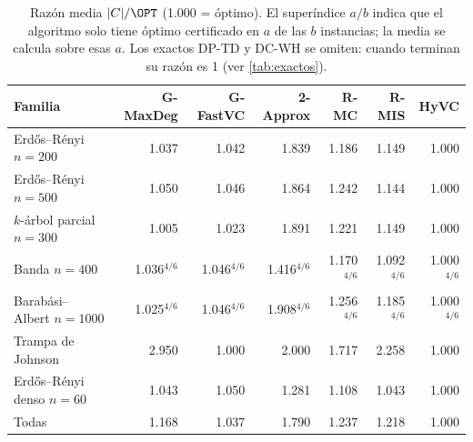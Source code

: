 \begin{table}[!htbp]\centering\scriptsize\setlength{\tabcolsep}{3.5pt}
\begin{tabular}{@{}lrrrrrr@{}}\toprule
Familia & \textsf{G-MaxDeg} & \textsf{G-FastVC} & \textsf{2-Approx} & \textsf{R-MC} & \textsf{R-MIS} & \textsf{HyVC} \\\midrule
Erdős–Rényi $n{=}200$ & 1.037 & 1.042 & 1.839 & 1.186 & 1.149 & 1.000 \\
Erdős–Rényi $n{=}500$ & 1.050 & 1.046 & 1.864 & 1.242 & 1.144 & 1.000 \\
$k$-árbol parcial $n{=}300$ & 1.005 & 1.023 & 1.891 & 1.221 & 1.149 & 1.000 \\
Banda $n{=}400$ & 1.036$^{4/6}$ & 1.046$^{4/6}$ & 1.416$^{4/6}$ & 1.170$^{4/6}$ & 1.092$^{4/6}$ & 1.000$^{4/6}$ \\
Barabási–Albert $n{=}1000$ & 1.025$^{4/6}$ & 1.046$^{4/6}$ & 1.908$^{4/6}$ & 1.256$^{4/6}$ & 1.185$^{4/6}$ & 1.000$^{4/6}$ \\
Trampa de Johnson & 2.950 & 1.000 & 2.000 & 1.717 & 2.258 & 1.000 \\
Erdős–Rényi denso $n{=}60$ & 1.043 & 1.050 & 1.281 & 1.108 & 1.043 & 1.000 \\
\midrule Todas & 1.168 & 1.037 & 1.790 & 1.237 & 1.218 & 1.000 \\
\bottomrule\end{tabular}
\caption{Razón media $|C|/\OPT$ (1.000 = óptimo). El superíndice $a/b$ indica que el algoritmo solo tiene óptimo certificado en $a$ de las $b$ instancias; la media se calcula sobre esas $a$. Los exactos \textsf{DP-TD} y \textsf{DC-WH} se omiten: cuando terminan su razón es 1 (ver \cref{tab:exactos}).}\label{tab:calidad}\end{table}
